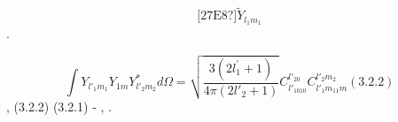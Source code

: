\documentclass[a4paper]{article}
\begin{document}
\begin{equation*}
\text{[27E8?]}\widetilde Y_{l_1m_1}
\end{equation*}
{\CYRO}{\cyrt}{\cyrd}{\cyre}{\cyrl}{\cyrsftsn}{\cyrn}{\cyro} {\cyrv}{\cyrery}{\cyrch}{\cyri}{\cyrs}{\cyrl}{\cyri}{\cyrm}
{\cyrv}{\cyrh}{\cyro}{\cyrd}{\cyrya}{\cyrshch}{\cyri}{\cyrishrt} {\cyrv} {\cyrd}{\cyra}{\cyrn}{\cyrn}{\cyro}{\cyre}
{\cyrv}{\cyrery}{\cyrr}{\cyra}{\cyrzh}{\cyre}{\cyrn}{\cyri}{\cyre}
{\cyri}{\cyrn}{\cyrt}{\cyre}{\cyrg}{\cyrr}{\cyra}{\cyrl}.

\begin{equation*}
\int Y_{l'_1m_1}Y_{1m}Y_{l'_2m_2}^{\ast }\mathit{d\Omega }=\sqrt{\frac{3(2l^'_1+1)}{4\pi
(2l'_2+1)}}C_{l'_1010}^{l'_20}C_{l'_1m_11m}^{l'_2m_2}(3.2.2)
\end{equation*}
{\CYRT}{\cyre}{\cyrp}{\cyre}{\cyrr}{\cyrsftsn}, {\cyrp}{\cyro}{\cyrd}{\cyrs}{\cyrt}{\cyra}{\cyrv}{\cyri}{\cyrv} (3.2.2)
{\cyrv} (3.2.1) {\cyri}
{\cyrv}{\cyro}{\cyrs}{\cyrp}{\cyro}{\cyrl}{\cyrsftsn}{\cyrz}{\cyro}{\cyrv}{\cyra}{\cyrv}{\cyrsh}{\cyri}{\cyrs}{\cyrsftsn}
{\cyri}{\cyrz}{\cyrv}{\cyre}{\cyrs}{\cyrt}{\cyrn}{\cyrery}{\cyrm}{\cyri}
{\cyrv}{\cyrery}{\cyrr}{\cyra}{\cyrzh}{\cyre}{\cyrn}{\cyri}{\cyrya}{\cyrm}{\cyri}
{\cyru}{\cyrg}{\cyrl}{\cyro}{\cyrv}{\cyro}{\cyrishrt} {\cyrch}{\cyra}{\cyrs}{\cyrt}{\cyri}
{\cyrr}{\cyra}{\cyrd}{\cyri}{\cyru}{\cyrs}-{\cyrv}{\cyre}{\cyrk}{\cyrt}{\cyro}{\cyrr}{\cyra}
{\cyrch}{\cyre}{\cyrr}{\cyre}{\cyrz} {\cyrs}{\cyrf}{\cyre}{\cyrr}{\cyri}{\cyrch}{\cyre}{\cyrs}{\cyrk}{\cyri}{\cyre}
{\cyrg}{\cyra}{\cyrr}{\cyrm}{\cyro}{\cyrn}{\cyri}{\cyrk}{\cyri}, {\cyrm}{\cyro}{\cyrzh}{\cyre}{\cyrm}
{\cyrv}{\cyrery}{\cyrch}{\cyri}{\cyrs}{\cyrl}{\cyri}{\cyrt}{\cyrsftsn}
{\cyru}{\cyrg}{\cyrl}{\cyro}{\cyrv}{\cyru}{\cyryu} {\cyrch}{\cyra}{\cyrs}{\cyrt}{\cyrsftsn}
{\cyrd}{\cyri}{\cyrp}{\cyro}{\cyrl}{\cyrsftsn}{\cyrn}{\cyro}{\cyrg}{\cyro}
{\cyrm}{\cyra}{\cyrt}{\cyrr}{\cyri}{\cyrch}{\cyrn}{\cyro}{\cyrg}{\cyro}
{\cyrerev}{\cyrl}{\cyre}{\cyrm}{\cyre}{\cyrn}{\cyrt}{\cyra}.
\end{document}
